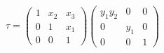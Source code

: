 \begin{equation}
\tau = 
\left(\begin{array}{ccc}
 1&x_{2} & x_{3}  \\ 0 & 1 & x_1 \\ 0 & 0 &1
\end{array}\right)
\left(\begin{array}{ccc}
 y_1 y_2 & 0 & 0 \\ 0 & y_1 & 0 \\ 0 & 0 &1
\end{array}\right)
\end{equation}

